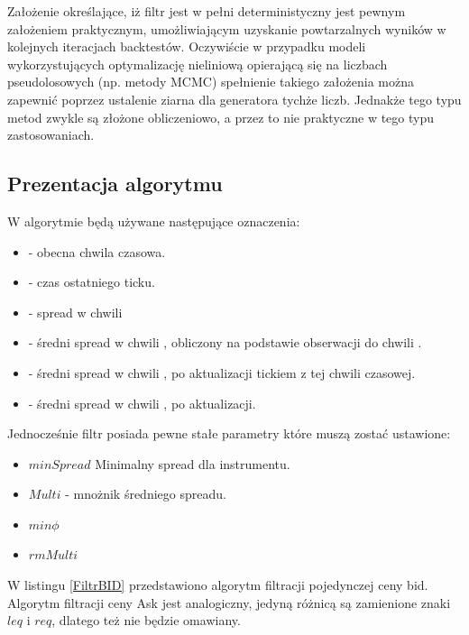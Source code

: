 \documentclass[a4paper,12pt,openany, DIV=calc, headsepline]{scrbook}
\begin{document}
Założenie określające, iż filtr jest w pełni deterministyczny jest pewnym założeniem praktycznym, umożliwiającym uzyskanie powtarzalnych wyników w kolejnych iteracjach backtestów. Oczywiście w przypadku modeli wykorzystujących optymalizację nieliniową opierającą się na liczbach pseudolosowych (np. metody MCMC) spełnienie takiego założenia można zapewnić poprzez ustalenie ziarna dla generatora tychże liczb. Jednakże tego typu metod zwykle są złożone obliczeniowo, a przez to nie praktyczne w tego typu zastosowaniach.  




\subsection{Prezentacja algorytmu}

W algorytmie będą używane następujące oznaczenia:

\begin{itemize}
\item \ts - obecna chwila czasowa.
\item \tsl - czas ostatniego ticku.
\item \Spt  - spread w chwili \ts
\item \MSpc - średni spread w chwili \ts, obliczony na podstawie obserwacji do chwili \tsl.
\item \MSpn - średni spread w chwili \ts, po aktualizacji tickiem z tej chwili czasowej.
\item \MSpo - średni spread w chwili \tsl, po aktualizacji.
\end{itemize}

Jednocześnie filtr posiada pewne stałe parametry które muszą zostać ustawione:

\begin{itemize}
\item $minSpread$ Minimalny spread dla instrumentu.
\item $Multi$ - mnożnik średniego spreadu.
\item $min\phi$
\item $rmMulti$
\end{itemize}

W listingu \ref{FiltrBID} przedstawiono algorytm filtracji pojedynczej ceny bid. Algorytm filtracji ceny Ask jest analogiczny, jedyną różnicą są zamienione znaki $leq$ i $req$, dlatego też nie będzie omawiany.
\end{document}
